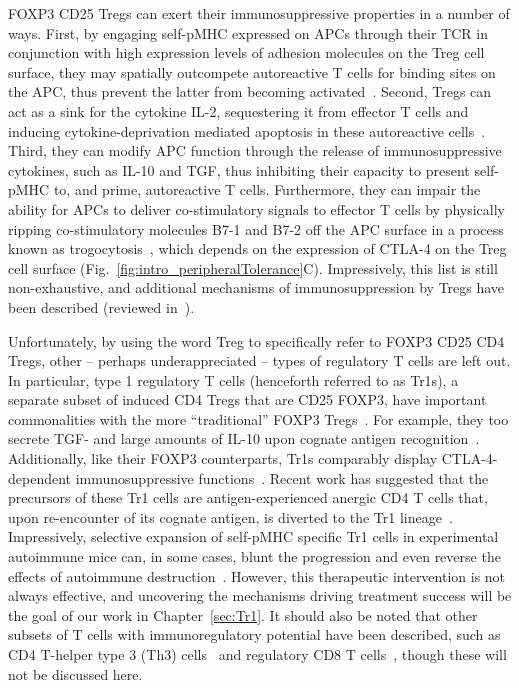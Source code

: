 FOXP3\pos{} CD25\pos{} Tregs can exert their immunosuppressive properties in a number of ways. First, by engaging self-pMHC expressed on APCs through their TCR in conjunction with high expression levels of adhesion molecules on the Treg cell surface, they may spatially outcompete autoreactive T cells for binding sites on the APC, thus prevent the latter from becoming activated~\cite{tadokoro2006regulatory,tang2008FOXP3+}. Second, Tregs can act as a sink for the cytokine IL-2, sequestering it from effector T cells and inducing cytokine-deprivation mediated apoptosis in these autoreactive cells~\cite{pandiyan2007cd4+}. Third, they can modify APC function through the release of immunosuppressive cytokines, such as IL-10 and TGF\textbeta{}, thus inhibiting their capacity to present self-pMHC to, and prime, autoreactive T cells. Furthermore, they can impair the ability for APCs to deliver co-stimulatory signals to effector T cells by physically ripping co-stimulatory molecules B7-1 and B7-2 off the APC surface in a process known as trogocytosis~\cite{tekguc2021treg}, which depends on the expression of CTLA-4 on the Treg cell surface (Fig.~\ref{fig:intro_peripheralTolerance}C). Impressively, this list is still non-exhaustive, and additional mechanisms of immunosuppression by Tregs have been described (reviewed in~\cite{sakaguchi2008regulatory,shevyrev2020treg}).

Unfortunately, by using the word Treg to specifically refer to FOXP3\pos{} CD25\pos{} CD4\pos{} Tregs, other -- perhaps underappreciated -- types of regulatory T cells are left out. In particular, type 1 regulatory T cells (henceforth referred to as Tr1s), a separate subset of induced CD4\pos{} Tregs that are CD25\neg{} FOXP3\neg{}, have important commonalities with the more ``traditional'' FOXP3\pos{} Tregs~\cite{sakaguchi2008regulatory,freeborn2022type}. For example, they too secrete TGF-\textbeta{} and large amounts of IL-10 upon cognate antigen recognition~\cite{bacchetta1994high,groux1997cd4+}. Additionally, like their FOXP3\pos{} counterparts, Tr1s comparably display CTLA-4-dependent immunosuppressive functions~\cite{chen2021alloantigen}. Recent work has suggested that the precursors of these Tr1 cells are antigen-experienced anergic CD4\pos{} T cells that, upon re-encounter of its cognate antigen, is diverted to the Tr1 lineage~\cite{thomann2021conversion}. Impressively, selective expansion of self-pMHC specific Tr1 cells in experimental autoimmune mice can, in some cases, blunt the progression and even reverse the effects of autoimmune destruction~\cite{clemente2016expanding,umeshappa2019suppression,umeshappa2020ubiquitous}. However, this therapeutic intervention is not always effective, and uncovering the mechanisms driving treatment success will be the goal of our work in Chapter~\ref{sec:Tr1}. It should also be noted that other subsets of T cells with immunoregulatory potential have been described, such as CD4\pos{} T-helper type 3 (Th3) cells~\cite{chen1994regulatory,krop2020regulatory} and regulatory CD8\pos{} T cells~\cite{mishra2021cd8+}, though these will not be discussed here.

